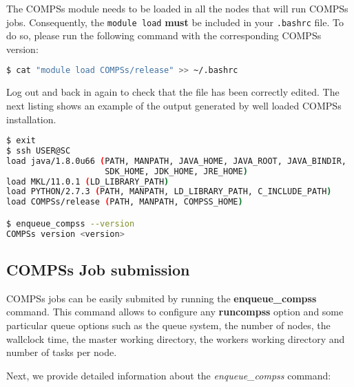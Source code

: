 The COMPSs module needs to be loaded in all the nodes that will run COMPSs jobs. Consequently, the \verb|module load| \textbf{must}
be included in your \verb|.bashrc| file. To do so, please run the following command with the corresponding COMPSs version:

\begin{lstlisting}[language=bash]
$ cat "module load COMPSs/release" >> ~/.bashrc
\end{lstlisting}

Log out and back in again to check that the file has been correctly edited. The next listing shows an example of the
output generated by well loaded COMPSs installation. 

\begin{lstlisting}[language=bash]
$ exit
$ ssh USER@SC
load java/1.8.0u66 (PATH, MANPATH, JAVA_HOME, JAVA_ROOT, JAVA_BINDIR,
                    SDK_HOME, JDK_HOME, JRE_HOME)
load MKL/11.0.1 (LD_LIBRARY_PATH)
load PYTHON/2.7.3 (PATH, MANPATH, LD_LIBRARY_PATH, C_INCLUDE_PATH)
load COMPSs/release (PATH, MANPATH, COMPSS_HOME)

$ enqueue_compss --version
COMPSs version <version>
\end{lstlisting}



\subsection{COMPSs Job submission}

COMPSs jobs can be easily submited by running the \textbf{enqueue\_compss} command. This command allows to configure any 
\textbf{runcompss} option and some particular queue options such as the queue system, the number of nodes, the wallclock time,
the master working directory, the workers working directory and number of tasks per node.

Next, we provide detailed information about the \textit{enqueue\_compss} command:

